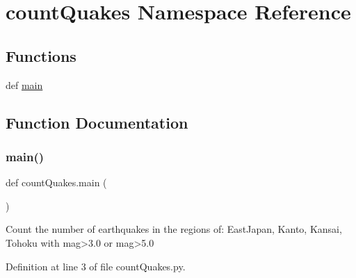 \hypertarget{namespacecount_quakes}{}\section{count\+Quakes Namespace Reference}
\label{namespacecount_quakes}
\subsection*{Functions}
\begin{DoxyCompactItemize}
\item 
def \hyperlink{namespacecount_quakes_af2db3db618829b210d350d6e04bf55ff}{main}
\end{DoxyCompactItemize}


\subsection{Function Documentation}
\mbox{\label{namespacecount_quakes_af2db3db618829b210d350d6e04bf55ff}} 
\subsubsection{\texorpdfstring{main()}{main()}}
{\footnotesize\ttfamily def count\+Quakes.\+main (\begin{DoxyParamCaption}{ }\end{DoxyParamCaption})}

\begin{DoxyVerb}Count the number of earthquakes in the regions of: EastJapan, Kanto, Kansai, Tohoku  with mag>3.0 or mag>5.0
\end{DoxyVerb}
 

Definition at line 3 of file count\+Quakes.\+py.

